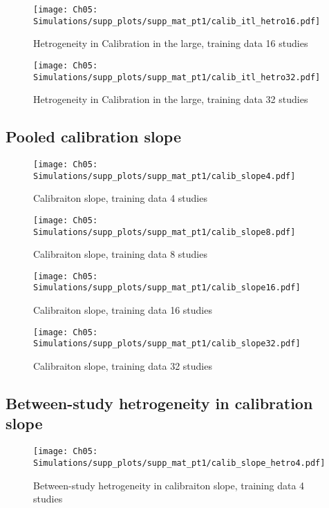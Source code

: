 \begin{figure}[H]
  \centering
  \texttt{[image: Ch05: Simulations/supp\_plots/supp\_mat\_pt1/calib\_itl\_hetro16.pdf]}
  \caption{Hetrogeneity in Calibration in the large, training data 16 studies}
\end{figure}

\begin{figure}[H]
  \centering
  \texttt{[image: Ch05: Simulations/supp\_plots/supp\_mat\_pt1/calib\_itl\_hetro32.pdf]}
  \caption{Hetrogeneity in Calibration in the large, training data 32 studies}
\end{figure}

\subsection{Pooled calibration slope}
\begin{figure}[H]
  \centering
  \texttt{[image: Ch05: Simulations/supp\_plots/supp\_mat\_pt1/calib\_slope4.pdf]}
  \caption{Calibraiton slope, training data 4 studies}
\end{figure}

\begin{figure}[H]
  \centering
  \texttt{[image: Ch05: Simulations/supp\_plots/supp\_mat\_pt1/calib\_slope8.pdf]}
  \caption{Calibraiton slope, training data 8 studies}
\end{figure}

\begin{figure}[H]
  \centering
  \texttt{[image: Ch05: Simulations/supp\_plots/supp\_mat\_pt1/calib\_slope16.pdf]}
  \caption{Calibraiton slope, training data 16 studies}
\end{figure}

\begin{figure}[H]
  \centering
  \texttt{[image: Ch05: Simulations/supp\_plots/supp\_mat\_pt1/calib\_slope32.pdf]}
  \caption{Calibraiton slope, training data 32 studies}
\end{figure}

\subsection{Between-study hetrogeneity in calibration slope}
\begin{figure}[H]
  \centering
  \texttt{[image: Ch05: Simulations/supp\_plots/supp\_mat\_pt1/calib\_slope\_hetro4.pdf]}
  \caption{Between-study hetrogeneity in calibraiton slope, training data 4 studies}
\end{figure}

